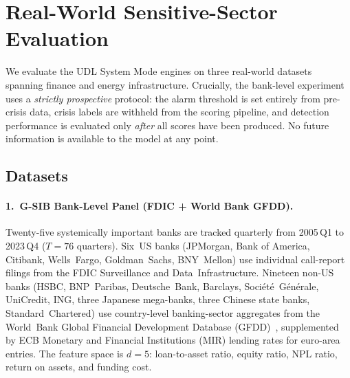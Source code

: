 
\section{Real-World Sensitive-Sector Evaluation}
\label{sec:real_world}

We evaluate the UDL System Mode engines on three real-world datasets
spanning finance and energy infrastructure.  Crucially, the bank-level
experiment uses a \emph{strictly prospective} protocol: the alarm
threshold is set entirely from pre-crisis data, crisis labels are
withheld from the scoring pipeline, and detection performance is
evaluated only \emph{after} all scores have been produced.  No future
information is available to the model at any point.

\subsection{Datasets}

\paragraph{1.\ G-SIB Bank-Level Panel (FDIC + World Bank GFDD).}
Twenty-five systemically important banks are tracked quarterly from
2005\,Q1 to 2023\,Q4 ($T{=}76$ quarters).  Six~US banks (JPMorgan,
Bank of America, Citibank, Wells~Fargo, Goldman~Sachs, BNY~Mellon)
use individual call-report filings from the FDIC Surveillance and
Data~Infrastructure.  Nineteen non-US banks (HSBC, BNP~Paribas,
Deutsche~Bank, Barclays, Soci\'{e}t\'{e}~G\'{e}n\'{e}rale,
UniCredit, ING, three Japanese mega-banks, three Chinese state banks,
Standard~Chartered) use country-level banking-sector aggregates from
the World~Bank Global Financial Development Database
(GFDD)~\cite{worldbank2024gfdd}, supplemented by ECB Monetary and
Financial Institutions (MIR) lending rates for euro-area entries.
The feature space is $d{=}5$: loan-to-asset ratio, equity ratio,
NPL ratio, return on assets, and funding cost.

